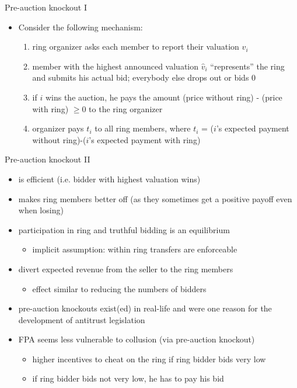 \documentclass[bigger]{beamer}
\begin{document}
\begin{frame}[label={sec:org722f56b}]{Pre-auction knockout I}
\begin{itemize}
\item Consider the following mechanism:
\begin{enumerate}
\item ring organizer asks each member to report their valuation \(v_i\)
\item member with the highest announced valuation \(\hat v_i\) “represents” the ring and submits his actual bid; everybody else drops out or bids 0
\item if \(i\) wins the auction, he pays the amount\linebreak
(price without ring) - (price with ring) \(\geq 0\) \linebreak
to the ring organizer
\item organizer pays \(t_i\) to all ring members, where\linebreak
\(t_i\) = (\(i\)'s expected payment without ring)-(\(i\)'s expected payment with ring)
\end{enumerate}
\end{itemize}
\end{frame}

\begin{frame}[label={sec:org5080175}]{Pre-auction knockout II}
\begin{itemize}
\item is efficient (i.e. bidder with highest valuation wins)
\item makes ring members better off (as they sometimes get a positive payoff even when losing)
\item participation in ring and truthful bidding is an equilibrium
\begin{itemize}
\item implicit assumption: within ring transfers are enforceable
\end{itemize}
\item divert expected revenue from the seller to the ring members
\begin{itemize}
\item effect similar to reducing the numbers of bidders
\pause
\end{itemize}
\item pre-auction knockouts exist(ed) in real-life and were one reason for the development of antitrust legislation
\item FPA seems less vulnerable to collusion (via pre-auction knockout)
\begin{itemize}
\item higher incentives to cheat on the ring if ring bidder bids very low
\item if ring bidder bids not very low, he has to pay his bid
\end{itemize}
\end{itemize}
\end{frame}
\end{document}
